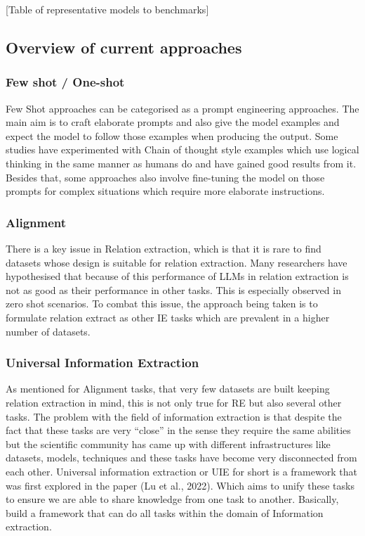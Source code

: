 \documentclass[twocolumn, 11pt]{extarticle}
\begin{document}
[Table of representative models to benchmarks]

\subsection{Overview of current approaches}


\subsubsection{Few shot / One-shot}
Few Shot approaches can be categorised as a prompt engineering approaches. The main aim is to craft elaborate prompts and also give the model examples and expect the model to follow those examples when producing the output. Some studies have experimented with Chain of thought style examples which use logical thinking in the same manner as humans do and have gained good results from it. Besides that, some approaches also involve fine-tuning the model on those prompts for complex situations which require more elaborate instructions. 

\subsubsection{Alignment}

There is a key issue in Relation extraction, which is that it is rare to find datasets whose design is suitable for relation extraction. Many researchers have hypothesised that because of this performance of LLMs in relation extraction is not as good as their performance in other tasks. This is especially observed in zero shot scenarios. To combat this issue, the approach being taken is to formulate relation extract as other IE tasks which are prevalent in a higher number of datasets. 

\subsubsection{Universal Information Extraction}
As mentioned for Alignment tasks, that very few datasets are built keeping relation extraction in mind, this is not only true for RE but also several other tasks. The problem with the field of information extraction is that despite the fact that these tasks are very “close” in the sense they require the same abilities but the scientific community has came up with different infrastructures like datasets, models, techniques and these tasks have become very disconnected from each other. Universal information extraction or UIE for short is a framework that was first explored in the paper (Lu et al., 2022). Which aims to unify these tasks to ensure we are able to share knowledge from one task to another. Basically, build a framework that can do all tasks within the domain of Information extraction.
\end{document}

